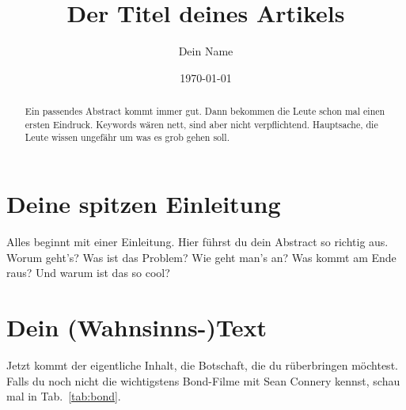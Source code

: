 \documentclass[a4paper, 12pt]{scrartcl}
\title{Der Titel deines Artikels}
\author{Dein Name}
\date{\today}
\begin{document}
\maketitle

\begin{abstract}
\noindent Ein passendes Abstract kommt immer gut. Dann bekommen die Leute schon mal einen ersten Eindruck. Keywords wären nett, sind aber nicht verpflichtend. Hauptsache, die Leute wissen ungefähr um was es grob gehen soll.
\end{abstract}

\section{Deine spitzen Einleitung}
Alles beginnt mit einer Einleitung. Hier führst du dein Abstract so richtig aus. Worum geht's? Was ist das Problem? Wie geht man's an? Was kommt am Ende raus? Und warum ist das so cool?

\section{Dein (Wahnsinns-)Text}
Jetzt kommt der eigentliche Inhalt, die Botschaft, die du rüberbringen möchtest. Falls du noch nicht die wichtigstens Bond-Filme mit Sean Connery kennst, schau mal in Tab.~\ref{tab:bond}. 
\end{document}

